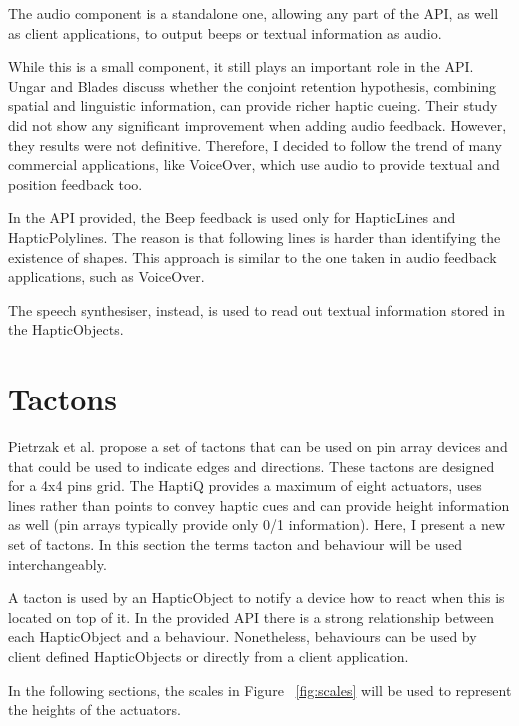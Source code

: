 The audio component is a standalone one, allowing any part of the API, as well as client applications, to output beeps or textual information as audio.

While this is a small component, it still plays an important role in the API. Ungar and Blades \cite{ungar2000can} discuss whether the conjoint retention hypothesis, combining spatial and linguistic information, can provide richer haptic cueing. Their study did not show any significant improvement when adding audio feedback. However, they results were not definitive. Therefore, I decided to follow the trend of many commercial applications, like VoiceOver, which use audio to provide textual and position feedback too.

In the API provided, the Beep feedback is used only for HapticLines and HapticPolylines. The reason is that following lines is harder than identifying the existence of shapes. This approach is similar to the one taken in audio feedback applications, such as VoiceOver.

The speech synthesiser, instead, is used to read out textual information stored in the HapticObjects.

\section{Tactons}
\label{sec:designTactons} 

Pietrzak et al. \cite{pietrzak2009creating} propose a set of tactons that can be used on pin array devices and that could be used to indicate edges and directions. These tactons are designed for a 4x4 pins grid. The HaptiQ provides a maximum of eight actuators, uses lines rather than points to convey haptic cues and can provide height information as well (pin arrays typically provide only 0/1 information). Here, I present a new set of tactons. In this section the terms tacton and behaviour will be used interchangeably.

A tacton is used by an HapticObject to notify a device how to react when this is located on top of it. In the provided API there is a strong relationship between each HapticObject and a behaviour. Nonetheless, behaviours can be used by client defined HapticObjects or directly from a client application.

In the following sections, the scales in Figure ~\ref{fig:scales} will be used to represent the heights of the actuators.

